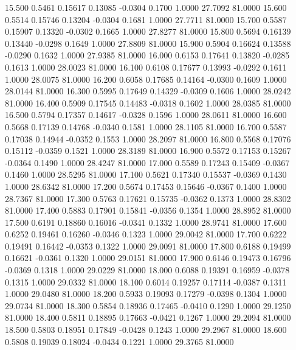   15.500   0.5461   0.15617   0.13085  -0.0304   0.1700   1.0000  27.7092  81.0000
  15.600   0.5514   0.15746   0.13204  -0.0304   0.1681   1.0000  27.7711  81.0000
  15.700   0.5587   0.15907   0.13320  -0.0302   0.1665   1.0000  27.8277  81.0000
  15.800   0.5694   0.16139   0.13440  -0.0298   0.1649   1.0000  27.8809  81.0000
  15.900   0.5904   0.16624   0.13588  -0.0290   0.1632   1.0000  27.9385  81.0000
  16.000   0.6153   0.17641   0.13820  -0.0285   0.1613   1.0000  28.0023  81.0000
  16.100   0.6108   0.17677   0.13993  -0.0292   0.1611   1.0000  28.0075  81.0000
  16.200   0.6058   0.17685   0.14164  -0.0300   0.1609   1.0000  28.0144  81.0000
  16.300   0.5995   0.17649   0.14329  -0.0309   0.1606   1.0000  28.0242  81.0000
  16.400   0.5909   0.17545   0.14483  -0.0318   0.1602   1.0000  28.0385  81.0000
  16.500   0.5794   0.17357   0.14617  -0.0328   0.1596   1.0000  28.0611  81.0000
  16.600   0.5668   0.17139   0.14768  -0.0340   0.1581   1.0000  28.1105  81.0000
  16.700   0.5587   0.17038   0.14944  -0.0352   0.1553   1.0000  28.2097  81.0000
  16.800   0.5568   0.17076   0.15112  -0.0359   0.1521   1.0000  28.3189  81.0000
  16.900   0.5572   0.17153   0.15267  -0.0364   0.1490   1.0000  28.4247  81.0000
  17.000   0.5589   0.17243   0.15409  -0.0367   0.1460   1.0000  28.5295  81.0000
  17.100   0.5621   0.17340   0.15537  -0.0369   0.1430   1.0000  28.6342  81.0000
  17.200   0.5674   0.17453   0.15646  -0.0367   0.1400   1.0000  28.7367  81.0000
  17.300   0.5763   0.17621   0.15735  -0.0362   0.1373   1.0000  28.8302  81.0000
  17.400   0.5883   0.17901   0.15841  -0.0356   0.1354   1.0000  28.8952  81.0000
  17.500   0.6191   0.18860   0.16016  -0.0341   0.1332   1.0000  28.9741  81.0000
  17.600   0.6252   0.19461   0.16260  -0.0346   0.1323   1.0000  29.0042  81.0000
  17.700   0.6222   0.19491   0.16442  -0.0353   0.1322   1.0000  29.0091  81.0000
  17.800   0.6188   0.19499   0.16621  -0.0361   0.1320   1.0000  29.0151  81.0000
  17.900   0.6146   0.19473   0.16796  -0.0369   0.1318   1.0000  29.0229  81.0000
  18.000   0.6088   0.19391   0.16959  -0.0378   0.1315   1.0000  29.0332  81.0000
  18.100   0.6014   0.19257   0.17114  -0.0387   0.1311   1.0000  29.0480  81.0000
  18.200   0.5933   0.19093   0.17279  -0.0398   0.1304   1.0000  29.0734  81.0000
  18.300   0.5854   0.18936   0.17465  -0.0410   0.1290   1.0000  29.1250  81.0000
  18.400   0.5811   0.18895   0.17663  -0.0421   0.1267   1.0000  29.2094  81.0000
  18.500   0.5803   0.18951   0.17849  -0.0428   0.1243   1.0000  29.2967  81.0000
  18.600   0.5808   0.19039   0.18024  -0.0434   0.1221   1.0000  29.3765  81.0000
